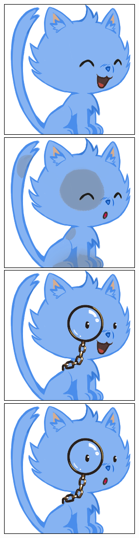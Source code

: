 \documentclass[a4paper, 12pt]{article}
\begin{document}
  \includegraphics[scale=0.45]{out/3.png}
  \includegraphics[scale=0.45]{out/24.png}
  \includegraphics[scale=0.45]{out/9.png}
  \includegraphics[scale=0.45]{out/12.png}
\end{document}
